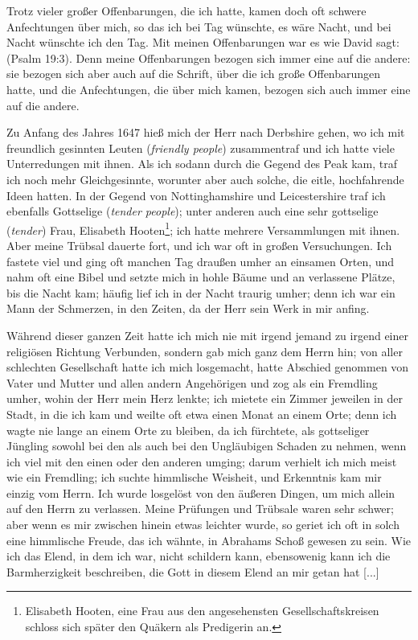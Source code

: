 Trotz vieler großer Offenbarungen, die ich hatte, kamen doch
oft schwere Anfechtungen über mich, 
so das ich bei Tag wünschte,
es wäre Nacht, und bei Nacht wünschte ich den Tag. Mit meinen
Offenbarungen war es wie David sagt:  
(Psalm 19:3).
Denn meine Offenbarungen bezogen sich immer eine auf die
andere: sie bezogen sich aber auch auf die Schrift, über die ich
große Offenbarungen hatte, und die Anfechtungen, die über mich
kamen, bezogen sich auch immer eine auf die andere.

Zu Anfang des Jahres 1647 hieß mich der Herr nach
Derbshire gehen, wo ich mit freundlich gesinnten Leuten 
(\textit{friendly people}) zusammentraf und ich hatte 
viele Unterredungen mit
ihnen. Als ich sodann durch die Gegend des Peak kam, traf
ich noch mehr Gleichgesinnte, worunter aber auch solche, die 
eitle, hochfahrende Ideen hatten. In der Gegend von 
Nottinghamshire
und Leicestershire traf ich ebenfalls Gottselige 
(\textit{tender people});
unter anderen auch eine sehr gottselige (\textit{tender}) 
Frau, Elisabeth Hooten\footnote{Elisabeth Hooten, eine Frau aus den angesehensten 
Gesellschaftskreisen schloss sich später den Quäkern als Predigerin an.}; 
ich hatte mehrere Versammlungen mit ihnen. Aber
meine Trübsal dauerte fort, und ich war oft in großen Versuchungen. 
Ich fastete viel und ging oft manchen Tag draußen
umher an einsamen Orten, und nahm oft eine Bibel und setzte
mich in hohle Bäume und an verlassene Plätze, 
bis die Nacht
kam; häufig lief ich in der Nacht traurig umher; denn ich war
ein Mann der Schmerzen, in den Zeiten, da der Herr sein Werk
in mir anfing.

Während dieser ganzen Zeit hatte ich mich nie mit irgend
jemand zu irgend einer religiösen Richtung Verbunden, sondern
gab mich ganz dem Herrn hin; von aller schlechten Gesellschaft
hatte ich mich losgemacht, hatte Abschied genommen von Vater
und Mutter und allen andern Angehörigen und zog als ein
Fremdling umher, wohin der Herr mein Herz lenkte; ich mietete
ein Zimmer jeweilen in der Stadt, in die ich kam und weilte oft
etwa einen Monat an einem Orte; denn ich wagte nie lange an
einem Orte zu bleiben, da ich fürchtete, als gottseliger Jüngling
sowohl bei den  als auch bei den Ungläubigen Schaden
zu nehmen, wenn ich viel mit den einen oder den anderen umging;
darum verhielt ich mich meist wie ein Fremdling; ich suchte himmlische 
Weisheit, und Erkenntnis kam mir einzig vom Herrn. Ich
wurde losgelöst von den äußeren Dingen, um mich allein auf
den Herrn zu verlassen. Meine Prüfungen und Trübsale waren
sehr schwer; aber wenn es mir zwischen hinein etwas leichter
wurde, so geriet ich oft in solch eine himmlische Freude, das ich
wähnte, in Abrahams Schoß gewesen zu sein. Wie ich das Elend,
in dem ich war, nicht schildern kann, ebensowenig kann ich die
Barmherzigkeit beschreiben, die Gott in diesem Elend an mir getan
hat [...]


